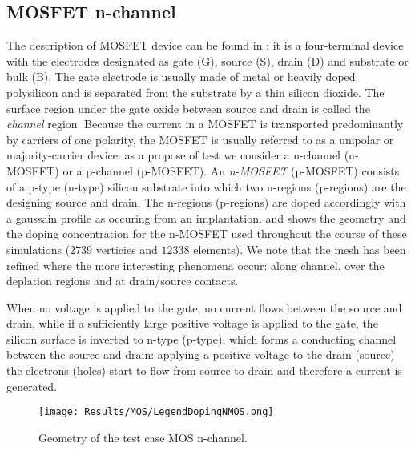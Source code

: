 \clearpage





\subsection{MOSFET n-channel}
\label{sec: MOS}


The description of MOSFET device can be found in \cite{ModernVLSIdevices}: it is a four-terminal device with the electrodes designated as gate (G), source (S), drain (D) and substrate or bulk (B). The gate electrode is usually made of metal or heavily doped polysilicon and is separated from the substrate by a thin silicon dioxide. The surface region under the gate oxide between source and drain is called the \textit{channel} region.
Because the current in a MOSFET is transported predominantly by carriers of one polarity, the MOSFET is usually referred to as a unipolar or majority-carrier device: as a propose of test we consider a n-channel (n-MOSFET) or a p-channel (p-MOSFET). An \textit{n-MOSFET} (p-MOSFET) consists of a p-type (n-type) silicon substrate into which two n-regions (p-regions) are the designing source and drain. The n-regions (p-regions) are doped accordingly with a gaussain profile as occuring from an implantation. 
 and  shows the geometry and the doping concentration for the n-MOSFET used throughout the course of these simulations ($2739$ verticies and $12338$ elements). 
We note that the mesh has been refined where the more interesting phenomena occur: along channel, over the deplation regions and at drain/source contacts.

When no voltage is applied to the gate, no current flows between the source and drain, while if a sufficiently large positive voltage is applied to the gate, the silicon surface is inverted to n-type (p-type), which forms a conducting channel between the source and drain: applying a positive voltage to the drain (source) the electrons (holes) start to flow from source to drain and therefore a current is generated. 

\begin{figure}[!b]
\centering
{}
\hspace{0.06\textwidth}
{\texttt{[image: Results/MOS/LegendDopingNMOS.png]}}
\caption{Geometry of the test case MOS n-channel.}
\label{fig: mos geometry}
\end{figure}




